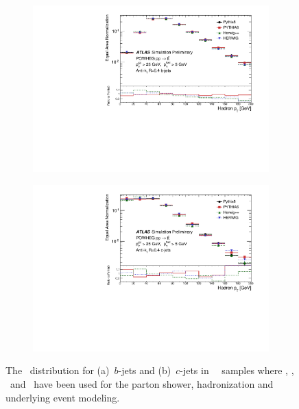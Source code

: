 \begin{figure}
\centering
\begin{subfigure}[]{0.45\textwidth}
\includegraphics[width=\textwidth]{evtgen/figures/Frag/Top/SingleB/h_HardHadpT.pdf}
\end{subfigure}
\begin{subfigure}[]{0.45\textwidth}
\includegraphics[width=\textwidth]{evtgen/figures/Frag/Top/SingleC/h_HardHadpT.pdf}
\end{subfigure}
\caption{The \ptHad\ distribution for 
(a)~$b$-jets and (b)~$c$-jets in \PowHeg\
\ttbar\ samples where  \PythiaE, \Pythia, \Herwigpp\ and \Herwig\ have been used 
for the parton shower, hadronization and underlying event modeling.}
\label{fig:thadpt}
\end{figure}


